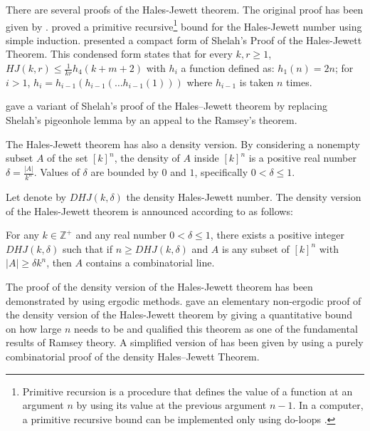 There are several proofs of the Hales-Jewett theorem. The original proof has been given by \cite{hales1987regularity}. \cite{shelah1988primitive} proved a primitive recursive\footnote{Primitive recursion is a procedure that defines the value of a function at an argument $n$ by using its value at the previous argument $n-1$.  In a computer, a primitive recursive bound can be implemented only using do-loops \citep{sep-recursive-functions}.} bound for the Hales-Jewett number using simple induction.
\cite{nilli1990shelah} presented a compact form of Shelah’s Proof of the Hales-Jewett Theorem.  This condensed form states that for every $k,r \geq 1$, $HJ(k,r) \leq \frac{1}{kr} h_4 (k+m+2)$ with $h_i$  a function defined as: $h_1(n)=2n$; for $i>1$, $h_i=h_{i-1}(h_{i-1}(\ldots h_{i-1}(1))) $ where $h_{i-1}$  is taken  $n$ times.

 \cite{matet2007shelah} gave a variant of Shelah’s proof of the Hales–Jewett theorem by replacing Shelah’s pigeonhole lemma by an appeal to the Ramsey’s theorem.

The Hales-Jewett theorem has also a density version. By considering a nonempty subset  $A$ of the set $[k]^n$, the density of $A$ inside $[k]^n$ is a positive real number $\delta=\frac{|A|}{k^n}$. Values of $\delta$ are bounded by $0$ and $1$, specifically  $0< \delta \leq 1.$ 

Let denote by $DHJ(k, \delta)$ the density Hales-Jewett number. The density version of the Hales-Jewett theorem is announced according to \cite{polymath2012new} as follows:

\begin{thm}   For any $k \in \mathbb{Z}^+$ and any real number $0< \delta \leq 1$,  there exists a positive integer $DHJ(k, \delta)$ such that if $n \geq DHJ(k,\delta)$ and $A$ is any subset of $[k] ^n$ with $|A| \geq \delta k^n$, then $A$ contains a combinatorial line.  \label{hj2}	\end{thm}

The proof of the density version of the Hales-Jewett theorem has been demonstrated by \cite{furstenberg1991density} using ergodic methods.  \cite{polymath2012new} gave an elementary non-ergodic proof of the density version of the Hales-Jewett theorem by giving a quantitative bound on how large $n$ needs to be and qualified this theorem as one of the fundamental results of Ramsey theory. A simplified version of \cite{polymath2012new} has been given by \cite{dodos2013simple} using  a purely combinatorial proof of the density Hales–Jewett Theorem.

